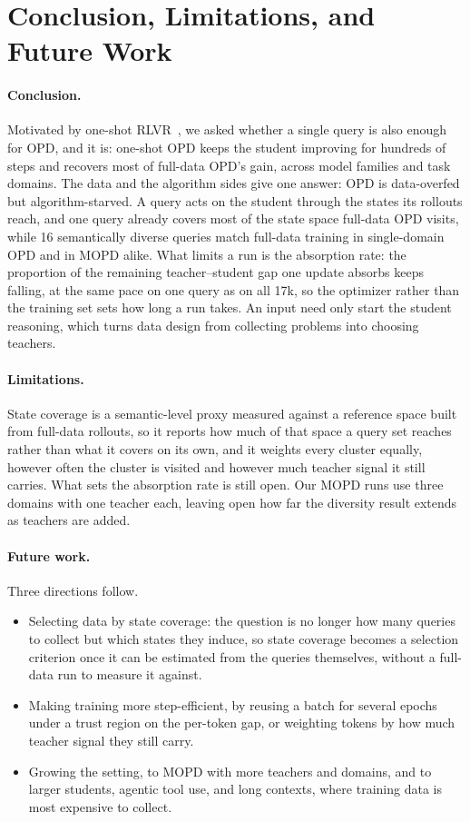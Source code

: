 \section{Conclusion, Limitations, and Future Work}
\label{sec:conclusion}
\label{sec:limitations}

\paragraph{Conclusion.} 
Motivated by one-shot RLVR~\citep{wang2025oneshot}, we asked whether a single query is also enough for OPD, and it is: one-shot OPD keeps the student improving for hundreds of steps and recovers most of full-data OPD's gain, across model families and task domains. The data and the algorithm sides give one answer: OPD is data-overfed but algorithm-starved. A query acts on the student through the states its rollouts reach, and one query already covers most of the state space full-data OPD visits, while 16 semantically diverse queries match full-data training in single-domain OPD and in MOPD alike. What limits a run is the absorption rate: the proportion of the remaining teacher--student gap one update absorbs keeps falling, at the same pace on one query as on all 17k, so the optimizer rather than the training set sets how long a run takes. An input need only start the student reasoning, which turns data design from collecting problems into choosing teachers.

\paragraph{Limitations.}
State coverage is a semantic-level proxy measured against a reference space built from full-data rollouts, so it reports how much of that space a query set reaches rather than what it covers on its own, and it weights every cluster equally, however often the cluster is visited and however much teacher signal it still carries. What sets the absorption rate is still open. Our MOPD runs use three domains with one teacher each, leaving open how far the diversity result extends as teachers are added.

\paragraph{Future work.}
Three directions follow.
\begin{itemize}[topsep=2pt, partopsep=0pt, leftmargin=12pt, itemsep=2pt]
    \item Selecting data by state coverage: the question is no longer how many queries to collect but which states they induce, so state coverage becomes a selection criterion once it can be estimated from the queries themselves, without a full-data run to measure it against.
    \item Making training more step-efficient, by reusing a batch for several epochs under a trust region on the per-token gap, or weighting tokens by how much teacher signal they still carry.
    \item Growing the setting, to MOPD with more teachers and domains, and to larger students, agentic tool use, and long contexts, where training data is most expensive to collect.
\end{itemize}